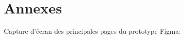 \documentclass[12pt,a4paper]{article}
\begin{document}
\clearpage
\appendix
\section{Annexes}

Capture d'écran des principales pages du prototype Figma:

\begin{figure}[h!]
  \centering
  \begin{minipage}[t]{0.45\linewidth}
\end{minipage}
\end{figure}
\end{document}
